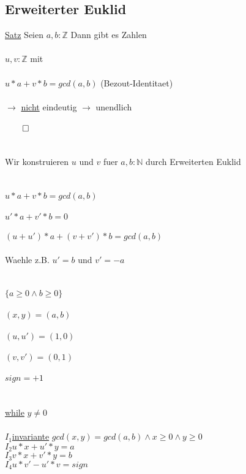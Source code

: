 \documentclass[18pt,a4paper]{article}
\newcommand{\tab}{\hspace*{2em}}
\begin{document}
\subsection{Erweiterter Euklid}

\uline{Satz} Seien $a,b : \mathbb{Z}$ Dann gibt es Zahlen \\
\\
\tab $u,v: \mathbb{Z}$ mit\\
\\
\tab $u * a + v * b = gcd(a,b)$ (Bezout-Identitaet)\\
\\
\tab $\rightarrow$ \uline{nicht} eindeutig $\rightarrow$ unendlich\\
\\
$\qed$\\
\\
\\
Wir konstruieren $u$ und $v$ fuer $a,b : \mathbb{N}$ durch Erweiterten Euklid\\
\\
\\
$u*a + v*b = gcd(a,b)$\\
\\
$u' *a + v' *b =0$\\
\\
$(u+u')*a + (v+v') *b = gcd(a,b)$\\
\\
Waehle z.B. $u' =b$ und $v' = -a$\\
\\
\\
$\{ a\geqslant 0 \wedge b\geqslant 0\}$\\
\\
$(x,y) = (a,b)$\\
\\
$(u,u') = (1,0)$\\
\\
$(v,v') = (0,1)$\\
\\
$sign = +1$\\
\\
\\
\uline{while} $y \neq 0$ \\
\\
$I_1$\tab \uline{invariante} $gcd(x,y) = gcd(a,b) \wedge x\geqslant 0 \wedge y\geqslant 0$\\
$I_2$\tab \tab \tab $u*x + u'*y = a$\\
$I_3$\tab \tab \tab$v*x + v'*y = b$\\
$I_4$\tab \tab \tab$u*v' - u'*v = sign$\\
\end{document}
